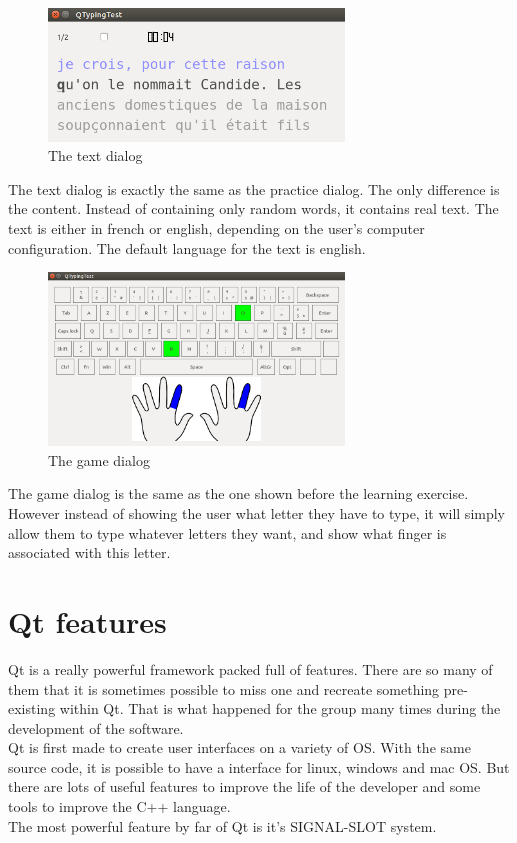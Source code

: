 \begin{figure}[H]
	\centering
	\includegraphics[width=0.7\textwidth]{images/dialog-text.png}
	 \caption{The text dialog}
	 \label{dialog-text}
\end{figure}

The text dialog is exactly the same as the practice dialog. The only difference is the content. Instead of containing only random words, it contains real text. The text is either in french or english, depending on the user's computer configuration. The default language for the text is english.

\begin{figure}[H]
	\centering
	\includegraphics[width=0.7\textwidth]{images/dialog-game.png}
	 \caption{The game dialog}
	 \label{dialog-game}
\end{figure}

The game dialog is the same as the one shown before the learning exercise. However instead of showing the user what letter they have to type, it will simply allow them to type whatever letters they want, and show what finger is associated with this letter. \\

\section{Qt features}

Qt is a really powerful framework packed full of features. There are so many of them that it is sometimes possible to miss one and recreate something pre-existing within Qt. That is what happened for the group many times during the development of the software.\\
Qt is first made to create user interfaces on a variety of OS. With the same source code, it is possible to have a interface for linux, windows and mac OS. But there are lots of useful features to improve the life of the developer and some tools to improve the C++ language.\\
The most powerful feature by far of Qt is it's SIGNAL-SLOT system.

